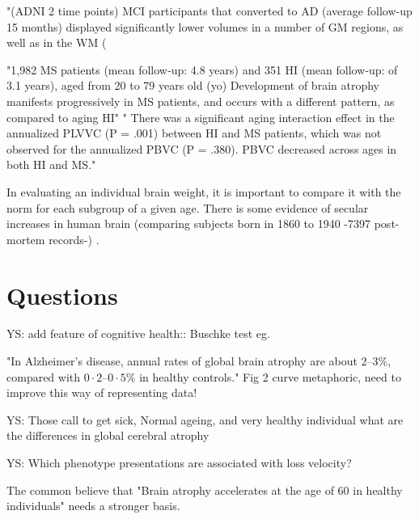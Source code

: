 \documentclass[twoside,onecolumn]{article}
\begin{document}
"(ADNI 2 time points) MCI participants that converted to AD (average follow-up 15 months) displayed significantly lower volumes in a number of GM regions, as well as in the WM (\cite{misra2009baseline}

"1,982 MS patients (mean follow‐up: 4.8 years) and 351 HI (mean follow‐up: of 3.1 years), aged from 20 to 79 years old (yo) Development of brain atrophy manifests progressively in MS patients, and occurs with a different pattern, as compared to aging HI" \cite{ghione2019aging}" There was a significant aging interaction effect in the annualized PLVVC (P = .001) between HI and MS patients, which was not observed for the annualized PBVC (P = .380). PBVC decreased across ages in both HI and MS."

In evaluating an individual brain weight, it is important to compare it with the norm for each subgroup of a given age. There is some evidence of secular increases in human brain (comparing subjects born  in 1860 to 1940 -7397 post-mortem records-) \cite{miller1977evidence}.


\section{Questions}
YS: add feature of cognitive health:: Buschke test eg.

"In Alzheimer’s disease, annual rates of global brain atrophy are about $2–3\%$, compared with $0·2–0·5\%$ in healthy controls."
Fig 2 curve metaphoric, need to improve this way of representing data!

YS: Those call to get sick,  Normal ageing, and very healthy individual what are the differences in global cerebral atrophy

YS: Which phenotype presentations are associated with loss velocity?

The common believe that "Brain atrophy accelerates at the age of 60 in healthy individuals" needs a stronger basis.
\end{document}
